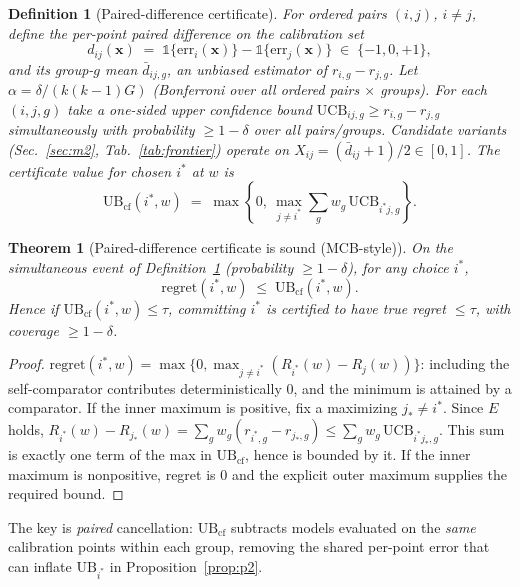 \documentclass{article}
\newtheorem{theorem}{Theorem}
\newtheorem{definition}{Definition}
\begin{document}
\begin{definition}[Paired-difference certificate]
\label{def:paired}
For ordered pairs $(i,j)$, $i\ne j$, define the per-point paired difference on the
calibration set
\[
  d_{ij}(\mathbf{x}) \;=\; \mathbb{1}\{\text{err}_i(\mathbf{x})\}
        - \mathbb{1}\{\text{err}_j(\mathbf{x})\} \;\in\; \{-1,0,+1\},
\]
and its group-$g$ mean $\bar d_{ij,g}$, an unbiased estimator of $r_{i,g}-r_{j,g}$.
Let $\alpha=\delta/(k(k-1)G)$ (Bonferroni over all ordered pairs $\times$ groups). For each
$(i,j,g)$ take a one-sided upper confidence bound
$\mathrm{UCB}_{ij,g}\ge r_{i,g}-r_{j,g}$ simultaneously with probability $\ge1-\delta$
over all pairs/groups. Candidate variants (Sec.~\ref{sec:m2}, Tab.~\ref{tab:frontier})
operate on $X_{ij}=(\bar d_{ij}+1)/2\in[0,1]$. The certificate value for chosen $i^*$ at $w$ is
\[
  \mathrm{UB}_{\mathrm{cf}}(i^*,w) \;=\;
  \max\!\left\{0,\ \max_{j\ne i^*}\sum_{g} w_g\, \mathrm{UCB}_{i^*j,g}\right\}.
\]
\end{definition}

\begin{theorem}[Paired-difference certificate is sound (MCB-style)]
\label{thm:m25}
On the simultaneous event of Definition~\ref{def:paired} (probability $\ge1-\delta$), for
\emph{any} choice $i^*$,
\[
  \mathrm{regret}(i^*,w)\;\le\;\mathrm{UB}_{\mathrm{cf}}(i^*,w).
\]
Hence if $\mathrm{UB}_{\mathrm{cf}}(i^*,w)\le\tau$, committing $i^*$ is certified to have
true regret $\le\tau$, with coverage $\ge1-\delta$.
\end{theorem}
\begin{proof}
$\mathrm{regret}(i^*,w)=\max\{0,\max_{j\ne i^*}(R_{i^*}(w)-R_j(w))\}$: including the
self-comparator contributes deterministically $0$, and the minimum is attained by a comparator.
If the inner maximum is positive, fix a maximizing $j_*\ne i^*$. Since
$E$ holds, $R_{i^*}(w)-R_{j_*}(w)=\sum_g w_g(r_{i^*,g}-r_{j_*,g})
\le \sum_g w_g\,\mathrm{UCB}_{i^*j_*,g}$. This sum is exactly one term of the max in
$\mathrm{UB}_{\mathrm{cf}}$, hence is bounded by it. If the inner maximum is nonpositive,
regret is $0$ and the explicit outer maximum supplies the required bound.
\end{proof}

The key is \emph{paired} cancellation: $\mathrm{UB}_{\mathrm{cf}}$ subtracts models evaluated
on the \emph{same} calibration points within each group, removing the shared per-point error
that can inflate $\mathrm{UB}_{i^*}$ in Proposition~\ref{prop:p2}.
\end{document}
